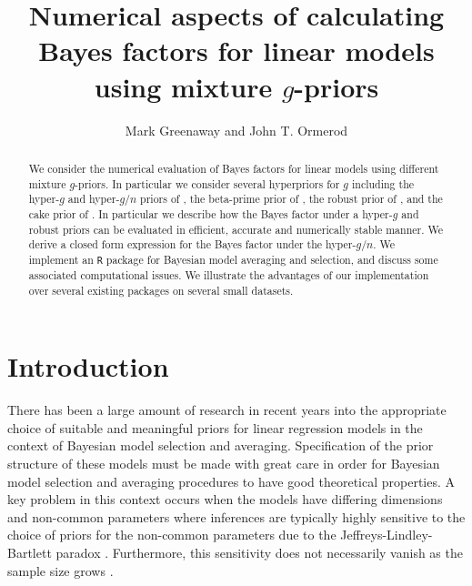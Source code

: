 \documentclass{article}[12pt]
\begin{document}


\title{Numerical aspects of calculating Bayes factors for linear models using
	mixture $g$-priors}

\author{Mark Greenaway
	and
	John T. Ormerod
}
 

\maketitle


\begin{abstract}
We consider the numerical evaluation of Bayes factors for linear models using different mixture 
$g$-priors. In particular we consider several hyperpriors for $g$ including  the hyper-$g$ and 
hyper-$g/n$ priors of \cite{Liang2008}, the beta-prime prior of \cite{Maruyama2011}, the robust 
prior of \cite{Bayarri2012}, and the cake prior of \cite{OrmerodEtal2017}. In particular we 
describe how the Bayes factor under a hyper-$g$ and robust priors can be evaluated in efficient, 
accurate and numerically stable manner. We derive a closed form expression for the Bayes factor 
under the hyper-$g/n$. We implement an {\tt R} package for Bayesian model averaging and selection,
and discuss some associated computational issues. We illustrate the advantages of our implementation 
over several existing packages on several small datasets.
\end{abstract}


\section{Introduction}

There has been a large amount of research in recent years into the appropriate choice of suitable 
and meaningful priors for linear regression models in the context of Bayesian model selection and 
averaging. Specification of the prior structure of these models must be made with great care in 
order for Bayesian model selection and averaging procedures to have good theoretical properties. 
A key problem in this context occurs when the models have differing dimensions and non-common 
parameters where inferences are typically highly sensitive to the choice of priors for the 
non-common parameters due to the Jeffreys-Lindley-Bartlett paradox \citep{Lindley1957,Bartlett1957,OrmerodEtal2017}.
Furthermore, this sensitivity does not necessarily vanish as the sample size 
grows \cite{Kass1995,Berger2001}.  
\end{document}
